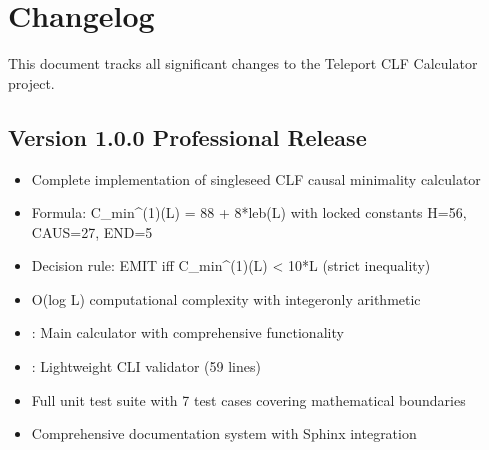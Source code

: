\documentclass[letterpaper,10pt,english]{sphinxmanual}
\begin{document}
\sphinxstepscope


\section{Changelog}
\label{\detokenize{changelog:changelog}}\label{\detokenize{changelog::doc}}
\sphinxAtStartPar
This document tracks all significant changes to the Teleport CLF Calculator project.


\subsection{Version 1.0.0 \sphinxhyphen{} Professional Release}
\label{\detokenize{changelog:version-1-0-0-professional-release}}
\sphinxAtStartPar
{}

\sphinxAtStartPar
{}
\begin{itemize}
\item {} 
\sphinxAtStartPar
Complete implementation of single\sphinxhyphen{}seed CLF causal minimality calculator

\item {} 
\sphinxAtStartPar
Formula: C\_min\textasciicircum{}(1)(L) = 88 + 8*leb(L) with locked constants H=56, CAUS=27, END=5

\item {} 
\sphinxAtStartPar
Decision rule: EMIT iff C\_min\textasciicircum{}(1)(L) \textless{} 10*L (strict inequality)

\item {} 
\sphinxAtStartPar
O(log L) computational complexity with integer\sphinxhyphen{}only arithmetic

\end{itemize}

\sphinxAtStartPar
{}
\begin{itemize}
\item {} 
\sphinxAtStartPar
{}: Main calculator with comprehensive functionality

\item {} 
\sphinxAtStartPar
{}: Lightweight CLI validator (59 lines)

\item {} 
\sphinxAtStartPar
Full unit test suite with 7 test cases covering mathematical boundaries

\item {} 
\sphinxAtStartPar
Comprehensive documentation system with Sphinx integration

\end{itemize}
\end{document}

